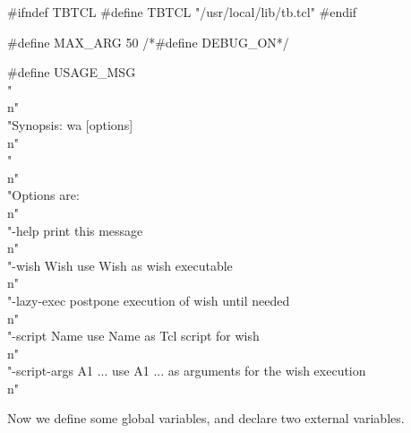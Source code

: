 #ifndef TBTCL
#define TBTCL   "/usr/local/lib/tb.tcl"
#endif

#define MAX_ARG 50
/*#define DEBUG_ON*/

#define USAGE_MSG \\
   "\\n" \\
   "Synopsis: wa [options]\\n" \\
   "\\n" \\
   "Options are:\\n" \\
   "-help                 print this message\\n" \\
   "-wish Wish            use Wish as wish executable\\n" \\
   "-lazy-exec            postpone execution of wish until needed\\n" \\
   "-script Name          use Name as Tcl script for wish\\n" \\
   "-script-args A1 ...   use A1 ... as arguments for the wish execution\\n"
\nwendcode{}\nwdocspar


Now we define some global variables, and declare two external variables.

